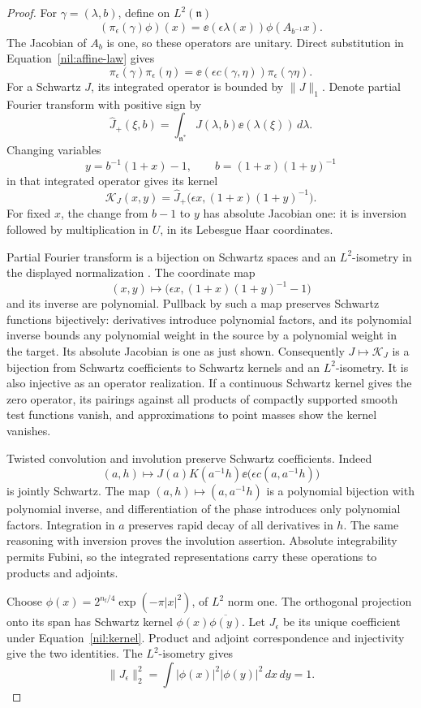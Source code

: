 \begin{proof}
For \(\gamma=(\lambda,b)\), define on \(L^2(\mathfrak n)\)
\[
 (\pi_\epsilon(\gamma)\phi)(x)
       =\ee(\epsilon\lambda(x))\phi(A_{b^{-1}}x).
\]
The Jacobian of \(A_b\) is one, so these operators are unitary.
Direct substitution in Equation~\ref{nil:affine-law} gives
\[
 \pi_\epsilon(\gamma)\pi_\epsilon(\eta)
       =\ee(\epsilon c(\gamma,\eta))\pi_\epsilon(\gamma\eta).
\]
For a Schwartz \(J\), its integrated operator is bounded by
\(\|J\|_1\). Denote partial Fourier transform with positive sign by
\[
 \widehat J_+(\xi,b)=\int_{\mathfrak n^*}
                         J(\lambda,b)\ee(\lambda(\xi))\,d\lambda.
\]
Changing variables
\[
 y=b^{-1}(1+x)-1,\qquad b=(1+x)(1+y)^{-1}
\]
in that integrated operator gives its kernel
\begin{equation}\label{nil:kernel}
 \mathcal K_J(x,y)=
   \widehat J_+\bigl(\epsilon x,(1+x)(1+y)^{-1}\bigr).
\end{equation}
For fixed \(x\), the change from \(b-1\) to \(y\) has absolute
Jacobian one: it is inversion followed by multiplication in \(U\),
in its Lebesgue Haar coordinates.

Partial Fourier transform is a bijection on Schwartz spaces
and an \(L^2\)-isometry in the displayed normalization
\cite[Chapter 8]{Folland1999}.
The coordinate map
\[
 (x,y)\longmapsto
       \bigl(\epsilon x,(1+x)(1+y)^{-1}-1\bigr)
\]
and its inverse are polynomial. Pullback by such a map preserves
Schwartz functions bijectively: derivatives introduce polynomial
factors, and its polynomial inverse bounds any polynomial weight
in the source by a polynomial weight in the target. Its absolute
Jacobian is one as just shown. Consequently
\(J\mapsto\mathcal K_J\) is a bijection from Schwartz coefficients
to Schwartz kernels and an \(L^2\)-isometry.
It is also injective as an operator realization. If a continuous
Schwartz kernel gives the zero operator, its pairings against
all products of compactly supported smooth test functions vanish,
and approximations to point masses show the kernel vanishes.

Twisted convolution and involution preserve Schwartz coefficients.
Indeed
\[
 (a,h)\longmapsto J(a)K(a^{-1}h)
          \ee\bigl(\epsilon c(a,a^{-1}h)\bigr)
\]
is jointly Schwartz. The map \((a,h)\mapsto(a,a^{-1}h)\) is a
polynomial bijection with polynomial inverse, and differentiation
of the phase introduces only polynomial factors. Integration in
\(a\) preserves rapid decay of all derivatives in \(h\).
The same reasoning with inversion proves the involution assertion.
Absolute integrability permits Fubini, so the integrated
representations carry these operations to products and adjoints.

Choose \(\phi(x)=2^{n_{\mathrm f}/4}\exp(-\pi|x|^2)\), of \(L^2\)
norm one. The orthogonal projection onto its span has Schwartz
kernel \(\phi(x)\overline{\phi(y)}\). Let \(J_\epsilon\) be its
unique coefficient under Equation~\ref{nil:kernel}.
Product and adjoint correspondence and injectivity give the two
identities. The \(L^2\)-isometry gives
\[
 \|J_\epsilon\|_2^2
   =\int|\phi(x)|^2|\phi(y)|^2\,dx\,dy=1.
\]
\end{proof}

